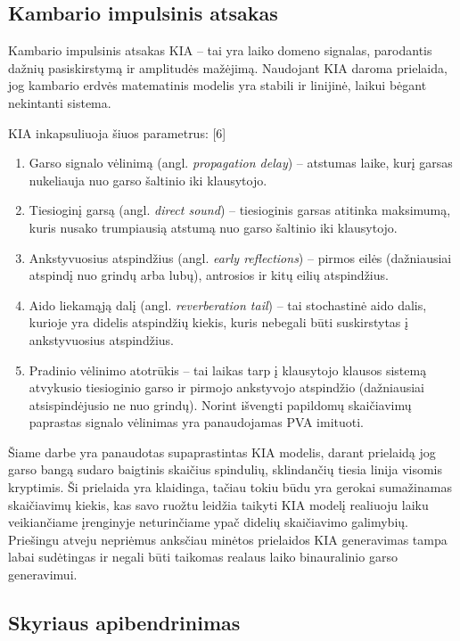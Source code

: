 \documentclass[]{vgtuef}
\begin{document}
\subsection{Kambario impulsinis atsakas}
\label{sect:KIA}

Kambario impulsinis atsakas KIA – tai yra laiko domeno signalas, parodantis dažnių pasiskirstymą ir amplitudės mažėjimą. Naudojant KIA daroma prielaida, jog kambario erdvės matematinis modelis yra stabili ir linijinė, laikui bėgant nekintanti sistema.

KIA inkapsuliuoja šiuos parametrus: [6]
\begin{enumerate}
  \item Garso signalo vėlinimą (angl. \textit{propagation delay}) – atstumas laike, kurį garsas nukeliauja nuo garso šaltinio iki klausytojo.
  \item Tiesioginį garsą (angl. \textit{direct sound}) – tiesioginis garsas atitinka maksimumą, kuris nusako trumpiausią atstumą nuo garso šaltinio iki klausytojo.
  \item Ankstyvuosius atspindžius (angl. \textit{early reflections}) – pirmos eilės (dažniausiai atspindį nuo grindų arba lubų), antrosios ir kitų eilių atspindžius.\item Aido liekamąją dalį (angl. \textit{reverberation tail}) – tai stochastinė aido dalis, kurioje yra didelis atspindžių kiekis, kuris nebegali būti suskirstytas į ankstyvuosius atspindžius.  
  \item Pradinio vėlinimo atotrūkis – tai laikas tarp į klausytojo klausos sistemą atvykusio tiesioginio garso ir pirmojo ankstyvojo atspindžio (dažniausiai atsispindėjusio ne nuo grindų). Norint išvengti papildomų skaičiavimų paprastas signalo vėlinimas yra panaudojamas PVA imituoti.
\end{enumerate}

Šiame darbe yra panaudotas supaprastintas KIA modelis, darant prielaidą jog garso bangą sudaro baigtinis skaičius spindulių, sklindančių tiesia linija visomis kryptimis. Ši prielaida yra klaidinga, tačiau tokiu būdu yra gerokai sumažinamas skaičiavimų kiekis, kas savo ruožtu leidžia taikyti KIA modelį realiuoju laiku veikiančiame įrenginyje neturinčiame ypač didelių skaičiavimo galimybių. Priešingu atveju nepriėmus anksčiau minėtos prielaidos KIA generavimas tampa labai sudėtingas ir negali būti taikomas realaus laiko binauralinio garso generavimui.


\subsection{Skyriaus apibendrinimas}
\end{document}
